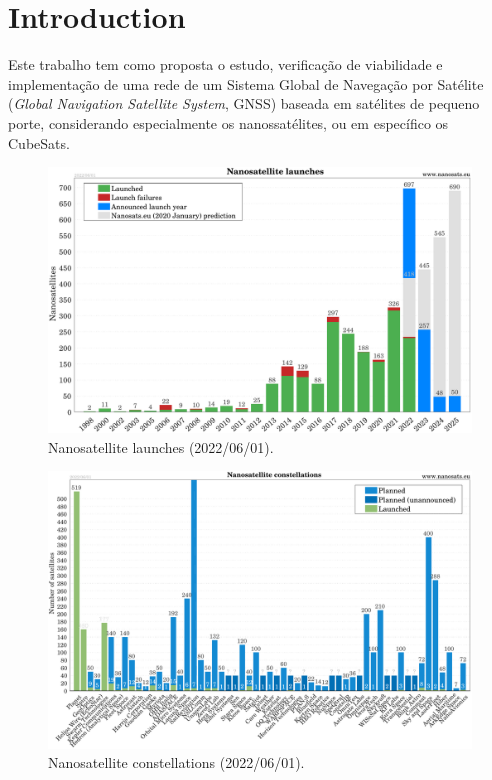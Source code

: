 %
%
%
%
%

%
%
%
%
%

\chapter{Introduction} \label{ch:introduction}

Este trabalho tem como proposta o estudo, verificação de viabilidade e implementação de uma rede de um Sistema Global de Navegação por Satélite (\textit{Global Navigation Satellite System}, GNSS) baseada em satélites de pequeno porte, considerando especialmente os nanossatélites, ou em específico os CubeSats.

\cite{nanosatseu}

\begin{figure}[!ht]
    \begin{center}
        \includegraphics[width=\columnwidth]{figures/Nanosats_years_2022-06-01}
        \caption{Nanosatellite launches (2022/06/01).}
        \label{fig:cubesat-launches}
    \end{center}
\end{figure}

\begin{figure}[!ht]
    \begin{center}
        \includegraphics[width=\columnwidth]{figures/Nanosats_constellations_2022-06-01}
        \caption{Nanosatellite constellations (2022/06/01).}
        \label{fig:constellations}
    \end{center}
\end{figure}
